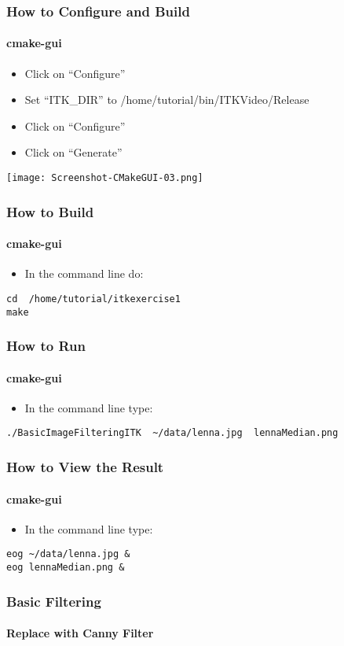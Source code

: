 \begin{frame}[fragile]
\frametitle{How to Configure and Build}
\framesubtitle{cmake-gui}
\begin{itemize}
\item Click on ``Configure''
\item Set ``ITK\_DIR'' to /home/tutorial/bin/ITKVideo/Release
\item Click on ``Configure''
\item Click on ``Generate''
\end{itemize}
\begin{center}
  \texttt{[image: Screenshot-CMakeGUI-03.png]}
\end{center}
\end{frame}

\begin{frame}[fragile]
\frametitle{How to Build}
\framesubtitle{cmake-gui}
\begin{itemize}
\item In the command line do:
\end{itemize}
\begin{verbatim}
cd  /home/tutorial/itkexercise1
make
\end{verbatim}
\end{frame}

\begin{frame}[fragile]
\frametitle{How to Run}
\framesubtitle{cmake-gui}
\begin{itemize}
\item In the command line type:
\end{itemize}
\begin{verbatim}
./BasicImageFilteringITK  ~/data/lenna.jpg  lennaMedian.png
\end{verbatim}
\end{frame}

\begin{frame}[fragile]
\frametitle{How to View the Result}
\framesubtitle{cmake-gui}
\begin{itemize}
\item In the command line type:
\end{itemize}
\begin{verbatim}
eog ~/data/lenna.jpg &
eog lennaMedian.png &
\end{verbatim}
\end{frame}


\begin{frame}
\frametitle{Basic Filtering}
\framesubtitle{Replace with Canny Filter}
\begin{center}
\end{center}
\end{frame}

